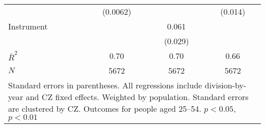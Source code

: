 {\begin{tabular}{l*{3}{c}}
            &    (0.0062)        &                    &     (0.014)        \\
[1em]
Instrument  &                    &       0.061\sym{*} &                    \\
            &                    &     (0.029)        &                    \\
\hline
$\bar{R}^2$ &        0.70        &        0.70        &        0.66        \\
$N$         &        5672        &        5672        &        5672        \\
\hline\hline
\multicolumn{4}{p{0.5\linewidth}}{\footnotesize Standard errors in parentheses.  All regressions include division-by-year and CZ fixed effects. Weighted by population.  Standard errors are clustered by CZ.  Outcomes for people aged 25--54.  \sym{*} \(p<0.05\), \sym{**} \(p<0.01\)}\\
\end{tabular}
}
